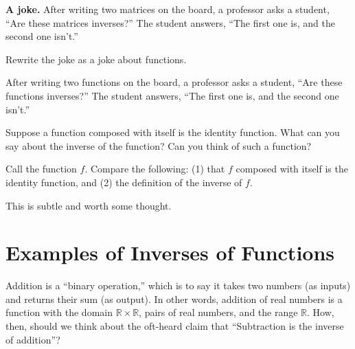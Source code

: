 \documentclass{ximera}
\begin{document}
\textbf{A joke.}  After writing two matrices on the board, a professor asks a student, ``Are these matrices inverses?''  The student answers, ``The first one is, and the second one isn't.''  

\begin{question}
Rewrite the joke as a joke about functions.  
\begin{freeResponse}
\begin{hint}
After writing two functions on the board, a professor asks a student, ``Are these functions inverses?''  The student answers, ``The first one is, and the second one isn't.''  
\end{hint}
\end{freeResponse}
\end{question}

\begin{question}
Suppose a function composed with itself is the identity function.  What can you say about the inverse of the function?  Can you think of such a function?  
\begin{hint}
Call the function $f$.  Compare the following:  (1) that $f$ composed with itself is the identity function, and (2) the definition of the inverse of $f$.
\end{hint}
\begin{freeResponse}
\begin{hint}
This is subtle and worth some thought.  
\end{hint}
\end{freeResponse}
\end{question}

\section*{Examples of Inverses of Functions}
Addition is a ``binary operation,'' which is to say it takes two numbers (as inputs) and returns their sum (as output).  In other words, addition of real numbers is a function with the domain $\mathbb R\times \mathbb R$, pairs of real numbers, and the range $\mathbb R$.  How, then, 
should we think about the oft-heard claim that ``Subtraction is the inverse of addition''?  
\end{document}
